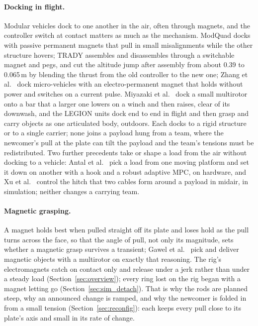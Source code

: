 \paragraph{Docking in flight.} Modular vehicles dock to one another in the air, often through magnets, and the
controller switch at contact matters as much as the mechanism. ModQuad docks with passive permanent magnets that
pull in small misalignments while the other structure hovers; TRADY \cite{sugihara2023trady} assembles and
disassembles through a switchable magnet and pegs, and cut the altitude jump after assembly from about 0.39 to
0.065\,m by blending the thrust from the old controller to the new one; Zhang et al.\ \cite{zhang2026epm} dock
micro-vehicles with an electro-permanent magnet that holds without power and switches on a current pulse. Miyazaki
et al.\ \cite{miyazaki2018airborne} dock a small multirotor onto a bar that a larger one lowers on a winch and then
raises, clear of its downwash, and the LEGION units dock end to end in flight and then grasp and carry objects as
one articulated body, outdoors. Each docks to a rigid structure or to a single carrier; none joins a payload hung
from a team, where the newcomer's pull at the plate can tilt the payload and the team's tensions must be
redistributed. Two further precedents take or shape a load from the air without docking to a vehicle: Antal et
al.\ \cite{antal2026hook} pick a load from one moving platform and set it down on another with a hook and a robust
adaptive MPC, on hardware, and Xu et al.\ \cite{xu2026hitches} control the hitch that two cables form around a
payload in midair, in simulation; neither changes a carrying team.

\paragraph{Magnetic grasping.} A magnet holds best when pulled straight off its plate and loses hold as the pull
turns across the face, so that the angle of pull, not only its magnitude, sets whether a magnetic grasp survives
a transient; Gawel et al.\ \cite{gawel2017magnetic} pick and deliver magnetic objects with a multirotor on exactly that reasoning. The
rig's electromagnets catch on contact only and release under a jerk rather than under a steady load
(Section~\ref{sec:overview}); every ring lost on the rig began with a magnet letting go
(Section~\ref{sec:sim_detach}). That is why the rods are planned steep, why an announced change is ramped, and why
the newcomer is folded in from a small tension (Section~\ref{sec:reconfig}): each keeps every pull close to its
plate's axis and small in its rate of change.
